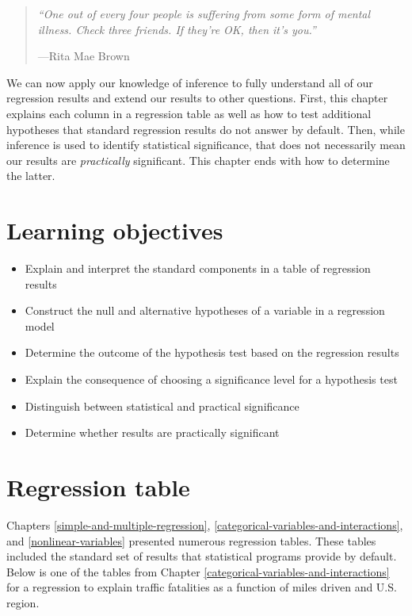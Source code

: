 \documentclass[
]{book}
\providecommand{\tightlist}{%
  \setlength{\itemsep}{0pt}\setlength{\parskip}{0pt}}
\newenvironment{learncheck}%
{%
  \par\vspace{\baselineskip}\noindent 
  \color{Exercise}\begin{itshape}%
  \par\vspace{\baselineskip}\noindent\ignorespaces 
}%
{%
  \end{itshape}\ignorespacesafterend 
}
\begin{document}
\begin{quote}
\emph{``One out of every four people is suffering from some form of mental illness. Check three friends. If they're OK, then it's you.''}

---Rita Mae Brown
\end{quote}

We can now apply our knowledge of inference to fully understand all of our regression results and extend our results to other questions. First, this chapter explains each column in a regression table as well as how to test additional hypotheses that standard regression results do not answer by default. Then, while inference is used to identify statistical significance, that does not necessarily mean our results are \emph{practically} significant. This chapter ends with how to determine the latter.

\hypertarget{lo12}{%
\section{Learning objectives}\label{lo12}}

\begin{learncheck}
\begin{itemize}
\tightlist
\item
  Explain and interpret the standard components in a table of regression
  results
\item
  Construct the null and alternative hypotheses of a variable in a
  regression model
\item
  Determine the outcome of the hypothesis test based on the regression
  results
\item
  Explain the consequence of choosing a significance level for a
  hypothesis test
\item
  Distinguish between statistical and practical significance
\item
  Determine whether results are practically significant
\end{itemize}
\end{learncheck}

\hypertarget{regression-table}{%
\section{Regression table}\label{regression-table}}

Chapters \ref{simple-and-multiple-regression}, \ref{categorical-variables-and-interactions}, and \ref{nonlinear-variables} presented numerous regression tables. These tables included the standard set of results that statistical programs provide by default. Below is one of the tables from Chapter \ref{categorical-variables-and-interactions} for a regression to explain traffic fatalities as a function of miles driven and U.S. region.
\end{document}
